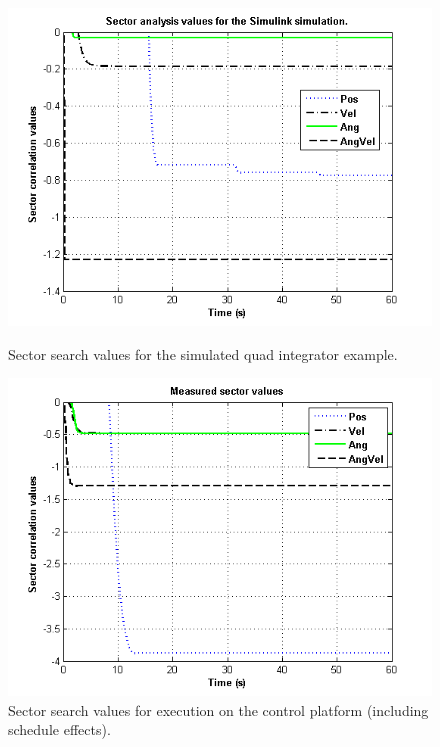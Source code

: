 \begin{figure}
\begin{minipage}[b]{0.5\linewidth}
\centering
\includegraphics[width=\columnwidth]{figures/simsectors.png}
    \caption{Sector search values for the simulated quad integrator example. }
\end{minipage}
\hspace{0.5cm}
\begin{minipage}[b]{0.5\linewidth}
\centering
\includegraphics[width=\columnwidth]{figures/meassectors.png}
    \caption{Sector search values for execution on the control platform
(including schedule effects). }
\end{minipage}
    \label{fig:sectors}
\end{figure}

